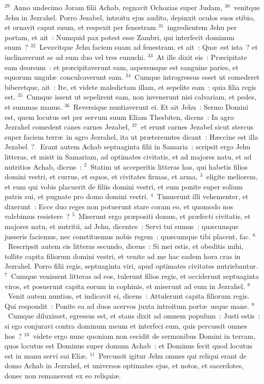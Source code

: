 ${}^{29}$~Anno undecimo Joram filii Achab, regnavit Ochozias super Judam,
${}^{30}$~venitque Jehu in Jezrahel. Porro Jezabel, introitu ejus audito, depinxit oculos suos stibio, et ornavit caput suum, et respexit per fenestram
${}^{31}$~ingredientem Jehu per portam, et ait~: Numquid pax potest esse Zambri, qui interfecit dominum suum~?
${}^{32}$~Levavitque Jehu faciem suam ad fenestram, et ait~: Qu\ae\ est ista~? et inclinaverunt se ad eum duo vel tres eunuchi.
${}^{33}$~At ille dixit eis~: Pr\ae cipitate eam deorsum~: et pr\ae cipitaverunt eam, aspersusque est sanguine paries, et equorum ungul\ae\ conculcaverunt eam.
${}^{34}$~Cumque introgressus esset ut comederet biberetque, ait~: Ite, et videte maledictam illam, et sepelite eam~: quia filia regis est.
${}^{35}$~Cumque issent ut sepelirent eam, non invenerunt nisi calvariam, et pedes, et summas manus.
${}^{36}$~Reversique nuntiaverunt ei. Et ait Jehu~: Sermo Domini est, quem locutus est per servum suum Eliam Thesbiten, dicens~: In agro Jezrahel comedent canes carnes Jezabel,
${}^{37}$~et erunt carnes Jezabel sicut stercus super faciem terr\ae\ in agro Jezrahel, ita ut pr\ae tereuntes dicant~: H\ae ccine est illa Jezabel~?
~\lettrine[lines=10,image=true,loversize=0.05,lraise=-0.03]{E}{}rant autem Achab septuaginta filii in Samaria~: scripsit ergo Jehu litteras, et misit in Samariam, ad optimates civitatis, et ad majores natu, et ad nutritios Achab, dicens~:
${}^{2}$~Statim ut acceperitis litteras has, qui habetis filios domini vestri, et currus, et equos, et civitates firmas, et arma,
${}^{3}$~eligite meliorem, et eum qui vobis placuerit de filiis domini vestri, et eum ponite super solium patris sui, et pugnate pro domo domini vestri.
${}^{4}$~Timuerunt illi vehementer, et dixerunt~: Ecce duo reges non potuerunt stare coram eo, et quomodo nos valebimus resistere~?
${}^{5}$~Miserunt ergo pr\ae positi domus, et pr\ae fecti civitatis, et majores natu, et nutritii, ad Jehu, dicentes~: Servi tui sumus~: qu\ae cumque jusseris faciemus, nec constituemus nobis regem~: qu\ae cumque tibi placent, fac.
${}^{6}$~Rescripsit autem eis litteras secundo, dicens~: Si mei estis, et obeditis mihi, tollite capita filiorum domini vestri, et venite ad me hac eadem hora cras in Jezrahel. Porro filii regis, septuaginta viri, apud optimates civitates nutriebantur.
${}^{7}$~Cumque venissent litteras ad eos, tulerunt filios regis, et occiderunt septuaginta viros, et posuerunt capita eorum in cophinis, et miserunt ad eum in Jezrahel.
${}^{8}$~Venit autem nuntius, et indicavit ei, dicens~: Attulerunt capita filiorum regis. Qui respondit~: Ponite ea ad duos acervos juxta introitum port\ae\ usque mane.
${}^{9}$~Cumque diluxisset, egressus est, et stans dixit ad omnem populum~: Justi estis~: si ego conjuravi contra dominum meum et interfeci eum, quis percussit omnes hos~?
${}^{10}$~videte ergo nunc quoniam non cecidit de sermonibus Domini in terram, quos locutus est Dominus super domum Achab~: et Dominus fecit quod locutus est in manu servi sui Eli\ae .
${}^{11}$~Percussit igitur Jehu omnes qui reliqui erant de domo Achab in Jezrahel, et universos optimates ejus, et notos, et sacerdotes, donec non remanerent ex eo reliqui\ae .


